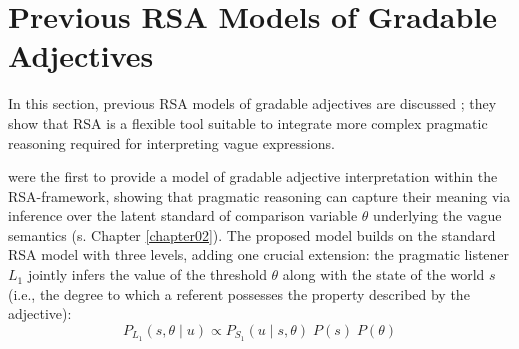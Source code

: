 \section{Previous RSA Models of Gradable Adjectives}
In this section, previous RSA models of gradable adjectives are discussed \parencite{lassiter2013context, tessler2017warm}; they show that RSA is a flexible tool suitable to integrate more complex pragmatic reasoning required for interpreting vague expressions.

\textcite{lassiter2013context} were the first to provide a model of gradable adjective interpretation within the RSA-framework, showing that pragmatic reasoning can capture their meaning via inference over the latent standard of comparison variable $\theta$ underlying the vague semantics (s. Chapter \ref{chapter02}). %
The proposed model builds on the standard RSA model with three levels, adding one crucial extension: the pragmatic listener $L_1$ jointly infers the value of the threshold $\theta$ along with the state of the world $s$ (i.e., the degree to which a referent possesses the property described by the adjective):
\begin{equation}
P_{L_1} (s, \theta \mid u) \propto P_{S_1} (u \mid s, \theta) \; P (s) \; P(\theta)
\end{equation} 

